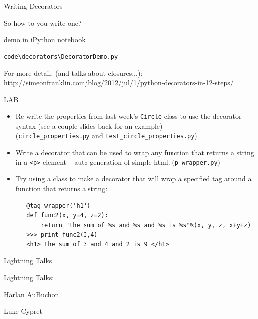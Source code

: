\documentclass{beamer}
\begin{document}
\begin{frame}[fragile]{Writing Decorators}

{\LARGE So how to you write one?}

\vfill
{\Large
demo in iPython notebook

\vfill
\begin{verbatim}
code\decorators\DecoratorDemo.py
\end{verbatim}
}

\vfill
{\large For more detail: (and talks about closures...):}\\

\url{http://simeonfranklin.com/blog/2012/jul/1/python-decorators-in-12-steps/}

\end{frame} 


\begin{frame}[fragile]{LAB}

\begin{itemize}
  \item Re-write the properties from last week's \verb|Circle| class
        to use the decorator syntax (see a couple slides back for an example)\\
        (\verb|circle_properties.py| and \verb|test_circle_properties.py|)
  \item Write a decorator that can be used to wrap any function that returns a string in a \verb|<p>| element -- auto-generation of simple html.
 (\verb|p_wrapper.py|)      

  \item Try using a class to make a decorator that will wrap a
   specified tag around a function that returns a string:
   \begin{verbatim}
   @tag_wrapper('h1')
   def func2(x, y=4, z=2):
       return "the sum of %s and %s and %s is %s"%(x, y, z, x+y+z)
   >>> print func2(3,4)
   <h1> the sum of 3 and 4 and 2 is 9 </h1>
   \end{verbatim}
\end{itemize}

\end{frame}

\begin{frame}{Lightning Talks}

{\LARGE Lightning Talks:}

\vfill
{\Large  Harlan AuBuchon}

\vfill
{\Large  Luke Cypret}

\end{frame}
\end{document}
